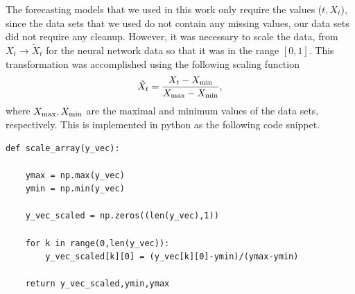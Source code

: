 \documentclass[10pt,a4paper]{article}
\begin{document}
The forecasting models that we used in this work only require the values ($t,X_t$), since the data sets that we used do not contain any missing values, our data sets did not require any cleanup. However, it was necessary to scale the data, from $X_t \rightarrow \tilde{X}_t$ for the neural network data so that it was in the range $[0,1]$. This transformation was accomplished using the following scaling function
\begin{equation}
 \tilde{X}_t = \frac{ X_t - X_{\rm min}}{X_{\rm max} - X_{\rm min}},
\end{equation} 
where $X_{\rm max}, X_{\rm min}$ are the maximal and minimum values of the data sets, respectively. This is implemented in python as the following code snippet.
\begin{lstlisting}
def scale_array(y_vec):
    
    ymax = np.max(y_vec)
    ymin = np.min(y_vec)
    
    y_vec_scaled = np.zeros((len(y_vec),1))
    
    for k in range(0,len(y_vec)):
        y_vec_scaled[k][0] = (y_vec[k][0]-ymin)/(ymax-ymin)
    
    return y_vec_scaled,ymin,ymax
\end{lstlisting}
\end{document}
